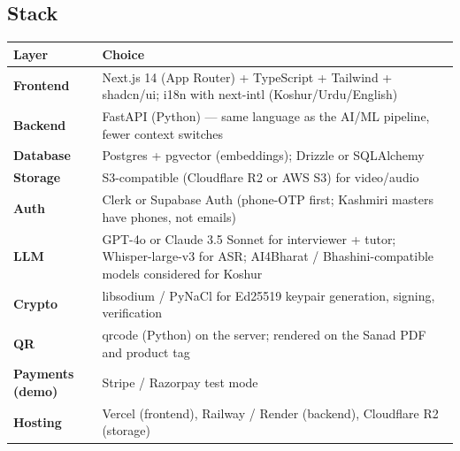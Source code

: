 \documentclass[11pt, a4paper]{article}
\begin{document}
\begin{center}
\end{center}

\subsection{Stack}

\begin{center}
\small
\begin{tabularx}{\linewidth}{>{\bfseries}lX}
\toprule
Layer & Choice \\
\midrule
Frontend & Next.js 14 (App Router) + TypeScript + Tailwind + shadcn/ui; i18n with next-intl (Koshur/Urdu/English) \\
Backend & FastAPI (Python) — same language as the AI/ML pipeline, fewer context switches \\
Database & Postgres + pgvector (embeddings); Drizzle or SQLAlchemy \\
Storage & S3-compatible (Cloudflare R2 or AWS S3) for video/audio \\
Auth & Clerk or Supabase Auth (phone-OTP first; Kashmiri masters have phones, not emails) \\
LLM & GPT-4o or Claude 3.5 Sonnet for interviewer + tutor; Whisper-large-v3 for ASR; AI4Bharat / Bhashini-compatible models considered for Koshur \\
Crypto & libsodium / PyNaCl for Ed25519 keypair generation, signing, verification \\
QR & qrcode (Python) on the server; rendered on the Sanad PDF and product tag \\
Payments (demo) & Stripe / Razorpay test mode \\
Hosting & Vercel (frontend), Railway / Render (backend), Cloudflare R2 (storage) \\
\bottomrule
\end{tabularx}
\end{center}
\end{document}
